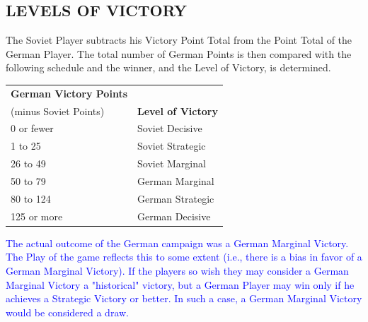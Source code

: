 \subsection{LEVELS OF VICTORY}

The Soviet Player subtracts his Victory Point Total from the Point Total of the German Player. The total number of German Points is then compared with the following schedule and the winner, and the Level of Victory, is determined.

{\small
\begin{tabular}{ll}
  \textbf{German Victory Points} &\\
  (minus Soviet Points) & \textbf{Level of Victory}\\
  0 or fewer & Soviet Decisive\\
  1 to 25 & Soviet Strategic\\
  26 to 49 & Soviet Marginal\\
  50 to 79 & German Marginal\\
  80 to 124 & German Strategic\\
  125 or more & German Decisive
\end{tabular}
}

\textcolor{blue}{The actual outcome of the German campaign was a German Marginal Victory. The Play of the game reflects this to some extent (i.e., there is a bias in favor of a German Marginal Victory). If the players so wish they may consider a German Marginal Victory a "historical" victory, but a German Player may win only if he achieves a Strategic Victory or better. In such a case, a German Marginal Victory would be considered a draw.}
